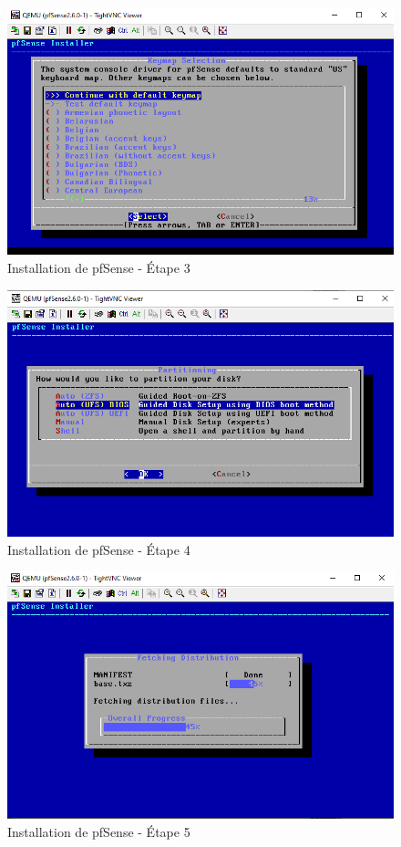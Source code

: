 \begin{figure}[H]
\centering
\includegraphics[width=15cm]{Images/BRadesMelian-Topologie4.png}
\caption{Installation de pfSense - Étape 3}
\label{Chap3.3.4}
\end{figure}

\begin{figure}[H]
\centering
\includegraphics[width=15cm]{Images/BRadesMelian-Topologie5.png}
\caption{Installation de pfSense - Étape 4}
\label{Chap3.3.5}
\end{figure}

\begin{figure}[H]
\centering
\includegraphics[width=15cm]{Images/BRadesMelian-Topologie6.png}
\caption{Installation de pfSense - Étape 5}
\label{Chap3.3.6}
\end{figure}

